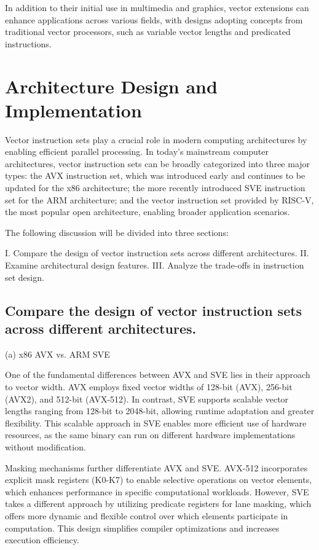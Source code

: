 \documentclass[conference]{IEEEtran}
\begin{document}
In addition to their initial use in multimedia and graphics, vector extensions can enhance applications across various fields, with designs adopting concepts from traditional vector processors, such as variable vector lengths and predicated instructions.


\section{Architecture Design and Implementation}
Vector instruction sets play a crucial role in modern computing architectures by 
enabling efficient parallel processing. In today's mainstream computer architectures, 
vector instruction sets can be broadly categorized into three major types: 
the AVX instruction set, which was introduced early and continues to be updated 
for the x86 architecture; the more recently introduced SVE instruction set for the ARM architecture; 
and the vector instruction set provided by RISC-V, the most popular open architecture, 
enabling broader application scenarios.

The following discussion will be divided into three sections:

I. Compare the design of vector instruction sets across different architectures.
II. Examine architectural design features.
III. Analyze the trade-offs in instruction set design.


\subsection{Compare the design of vector instruction sets across different architectures.}
(a) x86 AVX vs. ARM SVE

One of the fundamental differences between AVX and SVE lies in their approach to vector width. 
AVX employs fixed vector widths of 128-bit (AVX), 256-bit (AVX2), and 512-bit (AVX-512)\cite{b2}. 
In contrast, SVE supports scalable vector lengths ranging from 128-bit to 2048-bit, 
allowing runtime adaptation and greater flexibility\cite{b4}. 
This scalable approach in SVE enables more efficient use of hardware resources, as the same binary 
can run on different hardware implementations without modification.

Masking mechanisms further differentiate AVX and SVE. AVX-512 incorporates explicit mask registers (K0-K7) to enable selective operations on vector elements, which enhances performance in specific computational workloads\cite{b2}. However, SVE takes a different approach by utilizing predicate registers for lane masking, which offers more dynamic and flexible control over which elements participate in computation\cite{b5}. This design simplifies compiler optimizations and increases execution efficiency.
\end{document}
